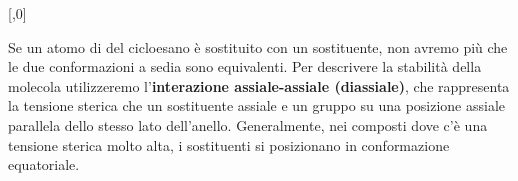 \begingroup
{}
\begin{reaction}
	[,0]
	\arrow{<->}
	\arrow{<->}
\end{reaction}
\label{rct:cicloesano_conf}
\endgroup

Se un atomo di  del cicloesano è sostituito con un sostituente, non avremo più che le due conformazioni a sedia sono equivalenti. Per descrivere la stabilità della molecola utilizzeremo l'\textbf{interazione assiale-assiale (diassiale)}, che rappresenta la tensione sterica che un sostituente assiale e un gruppo su una posizione assiale parallela dello stesso lato dell'anello. Generalmente, nei composti dove c'è una tensione sterica molto alta, i sostituenti si posizionano in conformazione equatoriale.